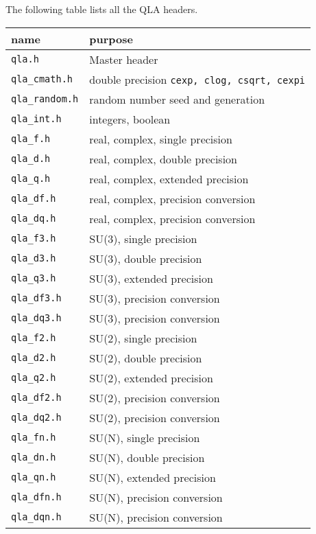 \documentclass{article}
\newcommand{\ttdash}{{\tt \_}}
\begin{document}
The following table lists all the QLA headers.
\begin{center}
\begin{tabular}{|l|l|}
\hline
 name & purpose \\
\hline
 {\tt qla.h }                   & Master header                       \\
 {\tt qla}\ttdash{\tt cmath.h } & double precision {\tt cexp, clog, csqrt, cexpi} \\
 {\tt qla}\ttdash{\tt random.h} & random number seed and generation   \\
 {\tt qla}\ttdash{\tt int.h   } & integers, boolean                   \\
 {\tt qla}\ttdash{\tt f.h     } & real, complex, single precision     \\
 {\tt qla}\ttdash{\tt d.h     } & real, complex, double precision     \\
 {\tt qla}\ttdash{\tt q.h     } & real, complex, extended precision   \\
 {\tt qla}\ttdash{\tt df.h    } & real, complex, precision conversion \\
 {\tt qla}\ttdash{\tt dq.h    } & real, complex, precision conversion \\
 {\tt qla}\ttdash{\tt f3.h    } & SU(3), single precision             \\
 {\tt qla}\ttdash{\tt d3.h    } & SU(3), double precision             \\
 {\tt qla}\ttdash{\tt q3.h    } & SU(3), extended precision           \\
 {\tt qla}\ttdash{\tt df3.h   } & SU(3), precision conversion         \\
 {\tt qla}\ttdash{\tt dq3.h   } & SU(3), precision conversion         \\
 {\tt qla}\ttdash{\tt f2.h    } & SU(2), single precision             \\
 {\tt qla}\ttdash{\tt d2.h    } & SU(2), double precision             \\
 {\tt qla}\ttdash{\tt q2.h    } & SU(2), extended precision           \\
 {\tt qla}\ttdash{\tt df2.h   } & SU(2), precision conversion         \\
 {\tt qla}\ttdash{\tt dq2.h   } & SU(2), precision conversion         \\
 {\tt qla}\ttdash{\tt fn.h    } & SU(N), single precision             \\
 {\tt qla}\ttdash{\tt dn.h    } & SU(N), double precision             \\
 {\tt qla}\ttdash{\tt qn.h    } & SU(N), extended precision           \\
 {\tt qla}\ttdash{\tt dfn.h   } & SU(N), precision conversion         \\
 {\tt qla}\ttdash{\tt dqn.h   } & SU(N), precision conversion         \\
\hline
\end{tabular}
\end{center}
\end{document}
